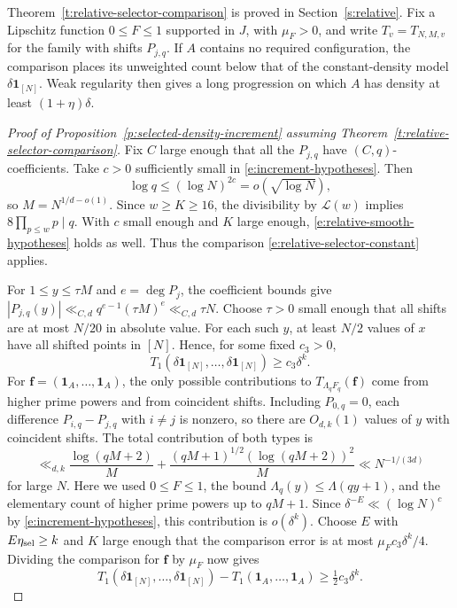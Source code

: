 \documentclass[12pt]{amsart}
\newcommand{\1}{\mathbf 1}
\theoremstyle{definition}
\begin{document}
Theorem~\ref{t:relative-selector-comparison} is proved in
Section~\ref{s:relative}. Fix a Lipschitz function \(0\le F\le 1\)
supported in \(J\), with \(\mu_F>0\), and write \(T_v=T_{N,M,v}\)
for the family with shifts \(P_{j,q}\). If \(A\) contains no
required configuration, the comparison places its unweighted
count below that of the constant-density model
\(\delta\mathbf 1_{[N]}\). Weak regularity then gives a long
progression on which \(A\) has density at least \((1+\eta)\delta\).

\begin{proof}[Proof of Proposition~\ref{p:selected-density-increment}
assuming Theorem~\ref{t:relative-selector-comparison}]
Fix \(C\) large enough that all the \(P_{j,q}\) have
\((C,q)\)-coefficients. Take \(c>0\) sufficiently small in \eqref{e:increment-hypotheses}.
Then 
\[\log q\le(\log N)^{2c}=o(\sqrt{\log N}),\] so
\(M=N^{1/d-o(1)}\).
Since \(w\ge K\ge16\), the divisibility by \(\mathcal L(w)\) implies
\(8\prod_{p\le w}p\mid q\). With \(c\) small enough and \(K\) large
enough, \eqref{e:relative-smooth-hypotheses} holds as well.
Thus the comparison \eqref{e:relative-selector-constant} applies.

For $1\leq y\leq\tau M$ and $e=\deg P_j$, the coefficient bounds
give $|P_{j,q}(y)|\ll_{C,d}q^{e-1}(\tau M)^e\ll_{C,d}\tau N$.
Choose $\tau>0$ small enough that all shifts are at most $N/20$
in absolute value. For each such $y$, at least $N/2$ values of
$x$ have all shifted points in $[N]$. Hence, for some fixed $c_3>0$,
\[T_1(\delta\mathbf1_{[N]},\ldots,\delta\mathbf1_{[N]})
\ge c_3\delta^k.\] 
For \(\mathbf f=(\mathbf1_A,\ldots,\mathbf1_A)\), the only possible
contributions to \(T_{\Lambda_qF_q}(\mathbf f)\) come from higher prime
powers and from coincident shifts. Including $P_{0,q}=0$, each difference $P_{i,q}-P_{j,q}$ with
$i\ne j$ is nonzero, so there are $O_{d,k}(1)$ values of $y$
with coincident shifts. The total contribution of both types is
\[
 \ll_{d,k}\frac{\log(qM+2)}{M}
       +\frac{(qM+1)^{1/2}(\log(qM+2))^2}{M}
 \ll N^{-1/(3d)}
\]
for large \(N\). Here we used \(0\le F\le1\), the bound
\(\Lambda_q(y)\le\Lambda(qy+1)\), and the elementary count of higher
prime powers up to \(qM+1\). Since \(\delta^{-E}\ll(\log N)^c\)
by \eqref{e:increment-hypotheses}, this contribution is \(o(\delta^k)\).
Choose \(E\) with \(E\eta_{\rm sel}\ge k\) and \(K\) large enough that
the comparison error is at most \(\mu_F c_3\delta^k/4\).
Dividing the comparison for \(\mathbf f\) by \(\mu_F\) now gives
\begin{equation}\label{e:unweighted-discrepancy-hyp}
 T_1(\delta\mathbf1_{[N]},\ldots,\delta\mathbf1_{[N]})
 -T_1(\mathbf1_A,\ldots,\mathbf1_A)\ge \tfrac12 c_3\delta^k.
\end{equation}


\end{proof}
\end{document}
